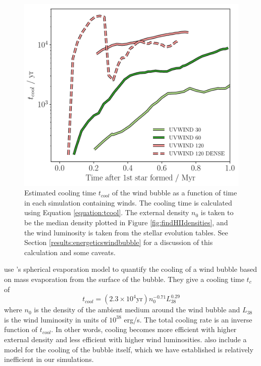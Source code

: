 \documentclass[a4paper,fleqn,usenatbib]{mnras}
\begin{document}
\begin{figure}
\includegraphics[width=0.98\columnwidth]{../plots/coolingtime.pdf}
\caption{Estimated cooling time $t_{cool}$ of the wind bubble as a function of time in each simulation containing winds. The cooling time is calculated using Equation \ref{equation:tcool}. The external density $n_0$ is taken to be the median density plotted in Figure \ref{fig:findHIIdensities}, and the wind luminosity is taken from the stellar evolution tables. See Section \ref{results:energeticswindbubble} for a discussion of this calculation and some caveats.}
\label{fig:coolingtimes}
\end{figure}

\cite{MacLow1988} use \cite{Cowie1977}'s spherical evaporation model to quantify the cooling of a wind bubble based on mass evaporation from the surface of the bubble. They give a cooling time $t_c$ of
\begin{equation}
t_{cool} = (2.3 \times 10^4 \mathrm{yr}) n_0^{-0.71} L_{38}^{0.29}
\label{equation:tcool}
\end{equation}
where $n_0$ is the density of the ambient medium around the wind bubble and $L_{38}$ is the wind luminosity in units of $10^{38}$ erg/s. The total cooling rate is an inverse function of $t_{cool}$. In other words, cooling becomes more efficient with higher external density and less efficient with higher wind luminosities. \cite{MacLow1988} also include a model for the cooling of the bubble itself, which we have established is relatively inefficient in our simulations.
\end{document}
